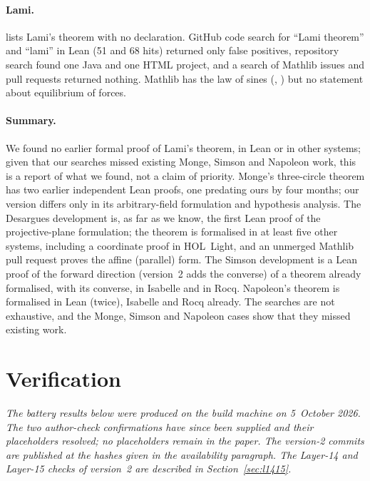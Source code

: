 \documentclass[11pt]{article}
\theoremstyle{definition}
\theoremstyle{remark}
\begin{document}
\paragraph{Lami.}  lists Lami's theorem with no declaration. GitHub code
search for ``Lami theorem'' and ``lami'' in Lean (51 and 68 hits) returned only false positives,
repository search found one Java and one HTML project, and a search of Mathlib issues and pull
requests returned nothing. Mathlib has the law of sines
(, )
but no statement about equilibrium of forces.

\paragraph{Summary.} We found no earlier formal proof of Lami's theorem, in Lean or in other
systems; given that our searches missed existing Monge, Simson and Napoleon work, this is a report
of what we found, not a claim of priority. Monge's three-circle theorem has two earlier
independent Lean proofs, one predating ours by four months; our version differs only in its
arbitrary-field formulation and hypothesis analysis. The Desargues
development is, as far as we know, the first Lean proof of the projective-plane formulation; the
theorem is formalised in at least five other systems, including a coordinate proof in HOL~Light,
and an unmerged Mathlib pull request proves the affine (parallel) form. The Simson development is
a Lean proof of the forward direction (version~2 adds the converse) of a theorem already formalised, with its converse, in
Isabelle and in Rocq. Napoleon's theorem is formalised in Lean (twice), Isabelle and Rocq
already. The searches are not exhaustive, and the Monge, Simson and Napoleon cases show that they
missed existing work.

\section{Verification}\label{sec:verify}

\emph{The battery results below were produced on the build machine on 5~October 2026. The two
author-check confirmations have since been supplied and their placeholders resolved; no
placeholders remain in the paper. The version-2 commits are published at the hashes given in the
availability paragraph. The Layer-14 and Layer-15 checks of
version~2 are described in Section~\ref{sec:l1415}.}
\end{document}
